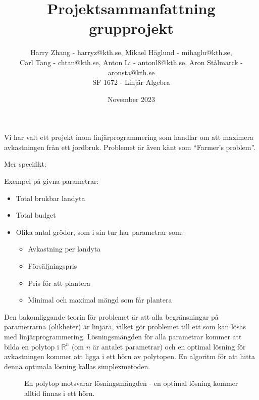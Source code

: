 \documentclass{article}
\title{Projektsammanfattning grupprojekt}
\author{
    Harry Zhang - harryz@kth.se, Mikael Häglund - mihaglu@kth.se, \\
    Carl Tang - chtan@kth.se, Anton Li - antonl8@kth.se, Aron Stålmarck - aronsta@kth.se \\
    SF 1672 - Linjär Algebra
}
\date{November 2023}
\begin{document}
\maketitle

Vi har valt ett projekt inom linjärprogrammering som handlar om att maximera avkastningen från ett jordbruk. Problemet är även känt som “Farmer’s problem”.

Mer specifikt:

Exempel på givna parametrar:
\begin{itemize}
    \item Total brukbar landyta
    \item Total budget
    \item Olika antal grödor, som i sin tur har parametrar som:
    \begin{itemize}
        \item Avkastning per landyta
        \item Försäljningspris
        \item Pris för att plantera
        \item Minimal och maximal mängd som får plantera
    \end{itemize}
\end{itemize}

Den bakomliggande teorin för problemet är att alla begränsningar på parametrarna (olikheter) är linjära, vilket gör problemet till ett som kan lösas med linjärprogrammering. Lösningsmängden för alla parametrar kommer att bilda en polytop i $\mathbb{R}^n$ (om $n$ är antalet parametrar) och en optimal lösning för avkastningen kommer att ligga i ett hörn av polytopen. En algoritm för att hitta denna optimala lösning kallas simplexmetoden.

\begin{figure}[h]
\centering
{}
\caption{En polytop motsvarar lösningsmängden - en optimal lösning kommer alltid finnas i ett hörn.}
\end{figure}
\end{document}
